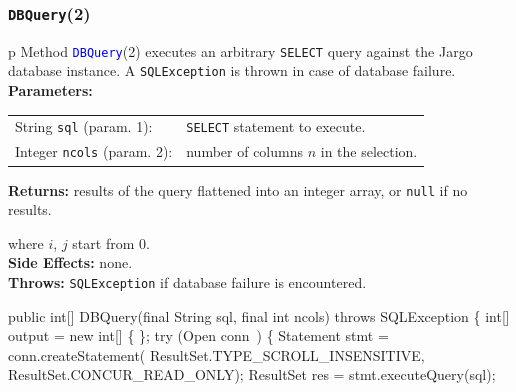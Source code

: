 \documentclass{article}
\def\nwendcode{\endtrivlist \endgroup}      %
\let\nwdocspar=\par
\theoremstyle{definition}                   %
\begin{document}
\subsubsection{{\tt{}\protect{}DBQuery}(2)}
\begin{tabular}{p{\textwidth}}
\toprule
{}
Method \textcolor{blue}{{\tt{}\protect{}DBQuery}}(2) executes an arbitrary {\tt{}SELECT}
query against the Jargo database instance.
A {\tt{}SQLException} is thrown in case of database failure.\\
\midrule
\textbf{Parameters:} \\
\begin{tabular}{lp{116mm}}
String {\tt{}sql} (param. 1):&{\tt{}SELECT} statement to execute.\\
Integer {\tt{}ncols} (param. 2):&number of columns $n$ in the selection.\\
\end{tabular}
\textbf{Returns:} results of the query flattened into an integer array,
or {\tt{}null} if no results.


where $i$, $j$ start from 0.\\
\textbf{Side Effects:} none.\\
\textbf{Throws:} {\tt{}SQLException} if database failure is encountered.\\
\bottomrule
\end{tabular}
\nwenddocs{}\endmoddef{}
public int[] DBQuery(final String sql, final int ncols) throws SQLException \{
  int[] output = new int[] \{ \};
  try (\LA{}Open \code{}conn\edoc{}~{\nwtagstyle{}}\RA{}) \{
    Statement stmt = conn.createStatement(
      ResultSet.TYPE_SCROLL_INSENSITIVE, ResultSet.CONCUR_READ_ONLY);
    ResultSet res = stmt.executeQuery(sql);
\nwendcode{}\nwdocspar
\end{document}
